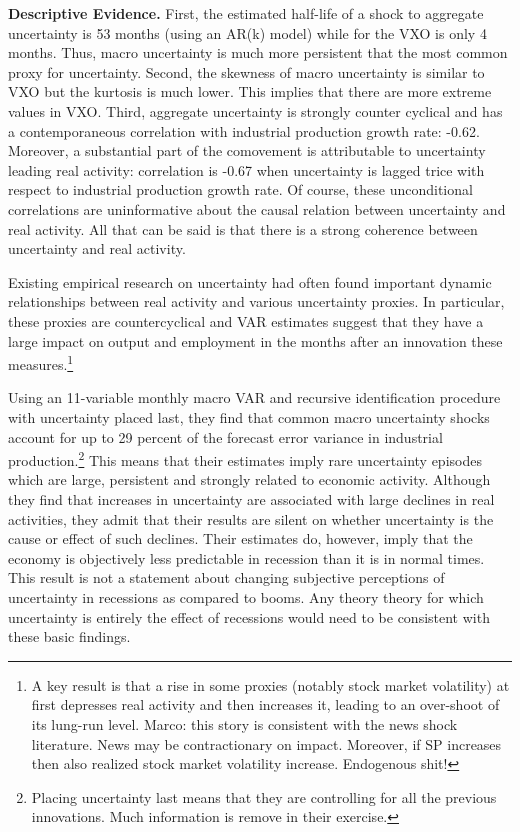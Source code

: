 \documentclass{article}
\begin{document}
{\textbf{Descriptive Evidence.} First, the estimated half-life of a shock to aggregate uncertainty is 53 months (using an AR(k) model) while for the VXO is only 4 months. Thus, macro uncertainty is much more persistent that the most common proxy for uncertainty. Second, the skewness of macro uncertainty is similar to VXO but the kurtosis is much lower. This implies that there are more extreme values in VXO. Third, aggregate uncertainty is strongly counter cyclical and has a contemporaneous correlation with industrial production growth rate: -0.62. Moreover, a substantial part of the comovement is attributable to uncertainty leading real activity: correlation is -0.67 when uncertainty is lagged trice with respect to industrial production growth rate. Of course, these unconditional correlations are uninformative about the causal relation between uncertainty and real activity. All that can be said is that there is a strong coherence between uncertainty and real activity. 

Existing empirical research on uncertainty had often found important dynamic relationships between real activity and various uncertainty proxies. In particular, these proxies are countercyclical and VAR estimates suggest that they have a large impact on output and employment in the months after an innovation these measures.\footnote{A key result is that a rise in some proxies (notably stock market volatility) at first depresses real activity and then increases it, leading to an over-shoot of its lung-run level. Marco: this story is consistent with the news shock literature. News may be contractionary on impact. Moreover, if SP increases then also realized stock market volatility increase. Endogenous shit!}

Using an 11-variable monthly macro VAR and recursive identification procedure with uncertainty placed last, they find that common macro uncertainty shocks account for up to 29 percent of the forecast error variance in industrial production.\footnote{Placing uncertainty last means that they are controlling for all the previous innovations. Much information is remove in their exercise.} This means that their estimates imply rare uncertainty episodes which are large, persistent and strongly related to economic activity. Although they find that increases in uncertainty are associated with large declines in real activities, they admit that their results are silent on whether uncertainty is the cause or effect of such declines. Their estimates do, however, imply that the economy is objectively less predictable in recession than it is in normal times. This result is not a statement about changing subjective perceptions of uncertainty in recessions as compared to booms. Any theory theory for which uncertainty is entirely the effect of recessions would need to be consistent with these basic findings.



}
\end{document}

